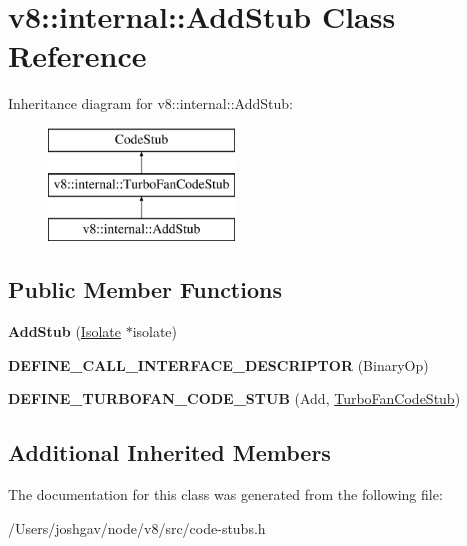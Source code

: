 \hypertarget{classv8_1_1internal_1_1_add_stub}{}\section{v8\+:\+:internal\+:\+:Add\+Stub Class Reference}
\label{classv8_1_1internal_1_1_add_stub}
Inheritance diagram for v8\+:\+:internal\+:\+:Add\+Stub\+:\begin{figure}[H]
\begin{center}
\leavevmode
\includegraphics[height=3.000000cm]{classv8_1_1internal_1_1_add_stub}
\end{center}
\end{figure}
\subsection*{Public Member Functions}
\begin{DoxyCompactItemize}
\item 
{\bfseries Add\+Stub} (\hyperlink{classv8_1_1internal_1_1_isolate}{Isolate} $\ast$isolate)\hypertarget{classv8_1_1internal_1_1_add_stub_aea19c816f480842a69023beb9f605c49}{}\label{classv8_1_1internal_1_1_add_stub_aea19c816f480842a69023beb9f605c49}

\item 
{\bfseries D\+E\+F\+I\+N\+E\+\_\+\+C\+A\+L\+L\+\_\+\+I\+N\+T\+E\+R\+F\+A\+C\+E\+\_\+\+D\+E\+S\+C\+R\+I\+P\+T\+OR} (Binary\+Op)\hypertarget{classv8_1_1internal_1_1_add_stub_abefbccda3916278fca9e88c08ff3276d}{}\label{classv8_1_1internal_1_1_add_stub_abefbccda3916278fca9e88c08ff3276d}

\item 
{\bfseries D\+E\+F\+I\+N\+E\+\_\+\+T\+U\+R\+B\+O\+F\+A\+N\+\_\+\+C\+O\+D\+E\+\_\+\+S\+T\+UB} (Add, \hyperlink{classv8_1_1internal_1_1_turbo_fan_code_stub}{Turbo\+Fan\+Code\+Stub})\hypertarget{classv8_1_1internal_1_1_add_stub_a6194c80d1bea456707a8beffbd177087}{}\label{classv8_1_1internal_1_1_add_stub_a6194c80d1bea456707a8beffbd177087}

\end{DoxyCompactItemize}
\subsection*{Additional Inherited Members}


The documentation for this class was generated from the following file\+:\begin{DoxyCompactItemize}
\item 
/\+Users/joshgav/node/v8/src/code-\/stubs.\+h\end{DoxyCompactItemize}
